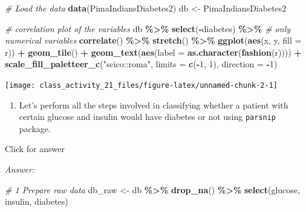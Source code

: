 \documentclass[
]{book}
\newenvironment{Shaded}{\begin{snugshade}}{\end{snugshade}}
\newcommand{\AttributeTok}[1]{\textcolor[rgb]{0.13,0.29,0.53}{#1}}
\newcommand{\CommentTok}[1]{\textcolor[rgb]{0.56,0.35,0.01}{\textit{#1}}}
\newcommand{\DecValTok}[1]{\textcolor[rgb]{0.00,0.00,0.81}{#1}}
\newcommand{\FunctionTok}[1]{\textcolor[rgb]{0.13,0.29,0.53}{\textbf{#1}}}
\newcommand{\NormalTok}[1]{#1}
\newcommand{\OtherTok}[1]{\textcolor[rgb]{0.56,0.35,0.01}{#1}}
\newcommand{\SpecialCharTok}[1]{\textcolor[rgb]{0.81,0.36,0.00}{\textbf{#1}}}
\newcommand{\StringTok}[1]{\textcolor[rgb]{0.31,0.60,0.02}{#1}}
\providecommand{\tightlist}{%
  \setlength{\itemsep}{0pt}\setlength{\parskip}{0pt}}
\begin{document}
\begin{Shaded}
\begin{Highlighting}[]
\CommentTok{\# Load the data}
\FunctionTok{data}\NormalTok{(PimaIndiansDiabetes2)}
\NormalTok{db }\OtherTok{\textless{}{-}}\NormalTok{ PimaIndiansDiabetes2}

\CommentTok{\# correlation plot of the variables}
\NormalTok{db }\SpecialCharTok{\%\textgreater{}\%}
  \FunctionTok{select}\NormalTok{(}\SpecialCharTok{{-}}\NormalTok{diabetes) }\SpecialCharTok{\%\textgreater{}\%}  \CommentTok{\# only numerical variables}
  \FunctionTok{correlate}\NormalTok{() }\SpecialCharTok{\%\textgreater{}\%}
  \FunctionTok{stretch}\NormalTok{() }\SpecialCharTok{\%\textgreater{}\%}
  \FunctionTok{ggplot}\NormalTok{(}\FunctionTok{aes}\NormalTok{(x, y, }\AttributeTok{fill =}\NormalTok{ r)) }\SpecialCharTok{+}
  \FunctionTok{geom\_tile}\NormalTok{() }\SpecialCharTok{+}
  \FunctionTok{geom\_text}\NormalTok{(}\FunctionTok{aes}\NormalTok{(}\AttributeTok{label =} \FunctionTok{as.character}\NormalTok{(}\FunctionTok{fashion}\NormalTok{(r)))) }\SpecialCharTok{+}
  \FunctionTok{scale\_fill\_paletteer\_c}\NormalTok{(}\StringTok{"scico::roma"}\NormalTok{, }\AttributeTok{limits =} \FunctionTok{c}\NormalTok{(}\SpecialCharTok{{-}}\DecValTok{1}\NormalTok{, }\DecValTok{1}\NormalTok{), }\AttributeTok{direction =} \SpecialCharTok{{-}}\DecValTok{1}\NormalTok{)}
\end{Highlighting}
\end{Shaded}

\texttt{[image: class\_activity\_21\_files/figure-latex/unnamed-chunk-2-1]}

\begin{enumerate}
\def\labelenumi{\alph{enumi}.}
\tightlist
\item
  Let's perform all the steps involved in classifying whether a patient with certain glucose and insulin would have diabetes or not using \texttt{parsnip} package.
\end{enumerate}

Click for answer

\emph{Answer:}

\begin{Shaded}
\begin{Highlighting}[]
\CommentTok{\# 1 Prepare raw data}
\NormalTok{db\_raw }\OtherTok{\textless{}{-}}\NormalTok{ db }\SpecialCharTok{\%\textgreater{}\%} \FunctionTok{drop\_na}\NormalTok{() }\SpecialCharTok{\%\textgreater{}\%}  \FunctionTok{select}\NormalTok{(glucose, insulin, diabetes)}
\end{Highlighting}
\end{Shaded}
\end{document}
